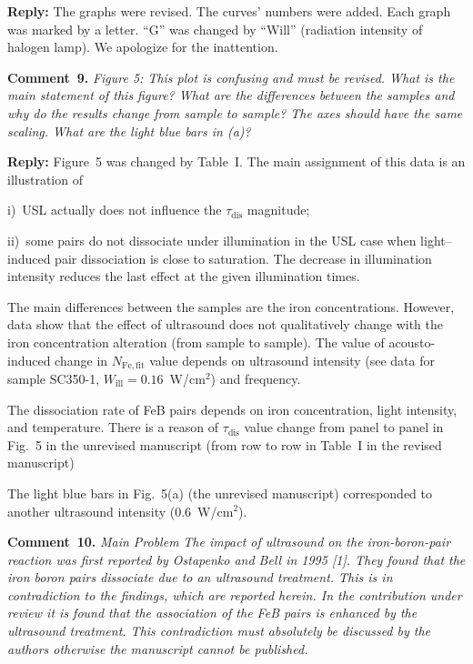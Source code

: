 \documentclass[sn-mathphys]{sn-jnl}
\begin{document}
\noindent
\textcolor[rgb]{0.51,0.00,0.00}{\textbf{Reply:}}
The graphs were revised.
The curves' numbers were added.
Each graph was marked by a letter.
``G'' was changed by ``Will'' (radiation intensity of halogen lamp).
We apologize for the inattention.


\vspace{1cm}
\noindent
\textcolor[rgb]{0.00,0.50,1.00}{\textbf{Comment~9.}}
\emph{Figure 5: This plot is confusing and must be revised. What is the main statement of this figure? What are the differences between the samples and why do the results change from sample to sample? The axes should have the same scaling. What are the light blue bars in (a)? }

\noindent
\textcolor[rgb]{0.51,0.00,0.00}{\textbf{Reply:}}
Figure~5 was changed by Table~I.
The main assignment of this data is an illustration of

\noindent
i)~USL actually does not influence the $\tau_\mathrm{dis}$  magnitude;

\noindent
ii)~some pairs do not dissociate under illumination in the USL case when light--induced pair dissociation is close to saturation.
The decrease in illumination intensity reduces the last effect at the given illumination times.

The main differences between the samples are the iron concentrations.
However, data show that
the effect of ultrasound does not qualitatively change with the iron concentration alteration
(from sample to sample).
The value of acousto-induced change in $N_\mathrm{Fe,fit}$ value depends on ultrasound intensity
(see data for sample SC350-1, $W_\mathrm{ill}=0.16$~W/cm$^2$) and frequency.


The dissociation rate of FeB pairs depends on iron concentration, light intensity, and
temperature\cite{Schmidt2019,FeBLight2,FeBKin2019,Lagowskii1993}.
There is a reason of $\tau_\mathrm{dis}$ value change from panel to panel in Fig.~5 in the unrevised manuscript (from row to row in Table~I in the revised manuscript)

The light blue bars in Fig.~5(a) (the unrevised manuscript) corresponded to another ultrasound intensity
(0.6~W/cm$^2$).

\vspace{1cm}
\noindent
\textcolor[rgb]{0.00,0.50,1.00}{\textbf{Comment~10.}}
\emph{Main Problem}
\emph{The impact of ultrasound on the iron-boron-pair reaction was first reported by Ostapenko and Bell in 1995 [1]. They found that the iron boron pairs dissociate due to an ultrasound treatment. This is in contradiction to the findings, which are reported herein. In the contribution under review it is found that the association of the FeB pairs is enhanced by the ultrasound treatment. This contradiction must absolutely be discussed by the authors otherwise the manuscript cannot be published.}
\end{document}
